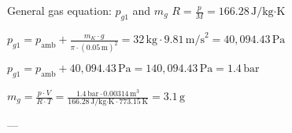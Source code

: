 General gas equation: \( p_{g1} \) and \( m_g \)  
\( R = \frac{p}{M} = 166.28 \, \text{J/kg·K} \)  

\( p_{g1} = p_{\text{amb}} + \frac{m_K \cdot g}{\pi \cdot (0.05 \, \text{m})^2} = 32 \, \text{kg} \cdot 9.81 \, \text{m/s}^2 = 40,094.43 \, \text{Pa} \)  

\( p_{g1} = p_{\text{amb}} + 40,094.43 \, \text{Pa} = 140,094.43 \, \text{Pa} = 1.4 \, \text{bar} \)  

\( m_g = \frac{p \cdot V}{R \cdot T} = \frac{1.4 \, \text{bar} \cdot 0.00314 \, \text{m}^3}{166.28 \, \text{J/kg·K} \cdot 773.15 \, \text{K}} = 3.1 \, \text{g} \)  

---